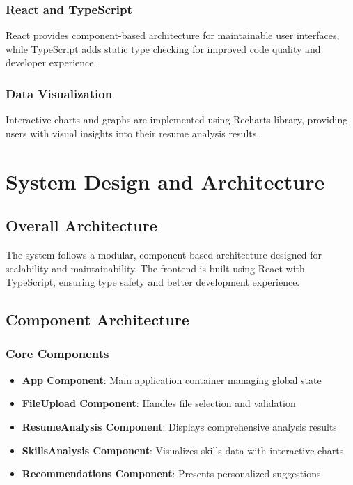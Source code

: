 \documentclass[12pt,a4paper]{article}
\begin{document}
\subsubsection{React and TypeScript}
React provides component-based architecture for maintainable user interfaces, while TypeScript adds static type checking for improved code quality and developer experience.

\subsubsection{Data Visualization}
Interactive charts and graphs are implemented using Recharts library, providing users with visual insights into their resume analysis results.

\section{System Design and Architecture}

\subsection{Overall Architecture}
The system follows a modular, component-based architecture designed for scalability and maintainability. The frontend is built using React with TypeScript, ensuring type safety and better development experience.

\subsection{Component Architecture}
\subsubsection{Core Components}
\begin{itemize}
    \item \textbf{App Component}: Main application container managing global state
    \item \textbf{FileUpload Component}: Handles file selection and validation
    \item \textbf{ResumeAnalysis Component}: Displays comprehensive analysis results
    \item \textbf{SkillsAnalysis Component}: Visualizes skills data with interactive charts
    \item \textbf{Recommendations Component}: Presents personalized suggestions
\end{itemize}
\end{document}
